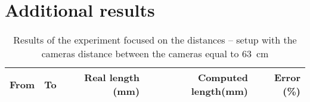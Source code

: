 \chapter{Additional results}

\begin{table}[h!]
\centering
\begin{tabular}{|r|r|r|r|r|}
\hline
From    & To    & Real length (mm) & Computed length(mm) & Error (\%) \\
\hline
\hline

\hline
\end{tabular}
\label{table:distances-second}
\caption{Results of the experiment focused on the distances -- setup with the cameras distance between the cameras equal to 63~cm}
\end{table}
